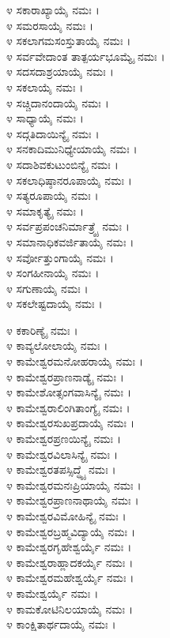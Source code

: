 ೪ ಸಕಾರಾಖ್ಯಾಯೈ ನಮಃ ।\\
೪ ಸಮರಸಾಯೈ ನಮಃ ।\\
೪ ಸಕಲಾಗಮಸಂಸ್ತುತಾಯೈ ನಮಃ ।\\
೪ ಸರ್ವವೇದಾಂತ ತಾತ್ಪರ್ಯಭೂಮ್ಯೈ ನಮಃ ।\\
೪ ಸದಸದಾಶ್ರಯಾಯೈ ನಮಃ ।\\
೪ ಸಕಲಾಯೈ ನಮಃ ।\\
೪ ಸಚ್ಚಿದಾನಂದಾಯೈ ನಮಃ ।\\
೪ ಸಾಧ್ಯಾಯೈ ನಮಃ ।\\
೪ ಸದ್ಗತಿದಾಯಿನ್ಯೈ ನಮಃ ।\\
೪ ಸನಕಾದಿಮುನಿಧ್ಯೇಯಾಯೈ ನಮಃ ।\\
೪ ಸದಾಶಿವಕುಟುಂಬಿನ್ಯೈ ನಮಃ ।\\
೪ ಸಕಲಾಧಿಷ್ಠಾನರೂಪಾಯೈ ನಮಃ ।\\
೪ ಸತ್ಯರೂಪಾಯೈ ನಮಃ ।\\
೪ ಸಮಾಕೃತ್ಯೈ ನಮಃ ।\\
೪ ಸರ್ವಪ್ರಪಂಚನಿರ್ಮಾತ್ರ್ಯೈ ನಮಃ ।\\
೪ ಸಮಾನಾಧಿಕವರ್ಜಿತಾಯೈ ನಮಃ ।\\
೪ ಸರ್ವೋತ್ತುಂಗಾಯೈ ನಮಃ ।\\
೪ ಸಂಗಹೀನಾಯೈ ನಮಃ ।\\
೪ ಸಗುಣಾಯೈ ನಮಃ ।\\
೪ ಸಕಲೇಷ್ಟದಾಯೈ ನಮಃ ।



೪ ಕಕಾರಿಣ್ಯೈ ನಮಃ ।\\
೪ ಕಾವ್ಯಲೋಲಾಯೈ ನಮಃ ।\\
೪ ಕಾಮೇಶ್ವರಮನೋಹರಾಯೈ ನಮಃ ।\\
೪ ಕಾಮೇಶ್ವರಪ್ರಾಣನಾಡ್ಯೈ ನಮಃ ।\\
೪ ಕಾಮೇಶೋತ್ಸಂಗವಾಸಿನ್ಯೈ ನಮಃ ।\\
೪ ಕಾಮೇಶ್ವರಾಲಿಂಗಿತಾಂಗ್ಯೈ ನಮಃ ।\\
೪ ಕಾಮೇಶ್ವರಸುಖಪ್ರದಾಯೈ ನಮಃ ।\\
೪ ಕಾಮೇಶ್ವರಪ್ರಣಯಿನ್ಯೈ ನಮಃ ।\\
೪ ಕಾಮೇಶ್ವರವಿಲಾಸಿನ್ಯೈ ನಮಃ ।\\
೪ ಕಾಮೇಶ್ವರತಪಸ್ಸಿದ್ಧ್ಯೈ ನಮಃ ।\\
೪ ಕಾಮೇಶ್ವರಮನಃಪ್ರಿಯಾಯೈ ನಮಃ ।\\
೪ ಕಾಮೇಶ್ವರಪ್ರಾಣನಾಥಾಯೈ ನಮಃ ।\\
೪ ಕಾಮೇಶ್ವರವಿಮೋಹಿನ್ಯೈ ನಮಃ ।\\
೪ ಕಾಮೇಶ್ವರಬ್ರಹ್ಮವಿದ್ಯಾಯೈ ನಮಃ ।\\
೪ ಕಾಮೇಶ್ವರಗೃಹೇಶ್ವರ್ಯೈ ನಮಃ ।\\
೪ ಕಾಮೇಶ್ವರಾಹ್ಲಾದಕರ್ಯೈ ನಮಃ ।\\
೪ ಕಾಮೇಶ್ವರಮಹೇಶ್ವರ್ಯೈ ನಮಃ ।\\
೪ ಕಾಮೇಶ್ವರ್ಯೈ ನಮಃ ।\\
೪ ಕಾಮಕೋಟಿನಿಲಯಾಯೈ ನಮಃ ।\\
೪ ಕಾಂಕ್ಷಿತಾರ್ಥದಾಯೈ ನಮಃ ।

